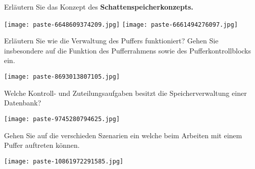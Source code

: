 \documentclass{article}
\begin{document}
\begin{tcolorbox}[colback=white!10!white,colframe=lightgray!75!black,
  savelowerto=\jobname_ex.tex,breakable,enhanced,lines before break=40]

\begin{center}
 Erläutern Sie das Konzept des 
\textbf{Schattenspeicherkonzepts.
} 

\end{center}

\tcblower

\justifying
\texttt{[image: paste-6648609374209.jpg]}
\texttt{[image: paste-6661494276097.jpg]}

\end{tcolorbox}
\begin{tcolorbox}[colback=white!10!white,colframe=lightgray!75!black,
  savelowerto=\jobname_ex.tex,breakable,enhanced,lines before break=40]

\begin{center}
 Erläutern Sie wie die Verwaltung des Puffers funktioniert? Gehen Sie insbesondere auf die Funktion des Pufferrahmens sowie des Pufferkontrollblocks ein. 

\end{center}

\tcblower

\justifying
\texttt{[image: paste-8693013807105.jpg]}

\end{tcolorbox}
\begin{tcolorbox}[colback=white!10!white,colframe=lightgray!75!black,
  savelowerto=\jobname_ex.tex,breakable,enhanced,lines before break=40]

\begin{center}
 Welche Kontroll- und Zuteilungsaufgaben besitzt die Speicherverwaltung einer Datenbank? 

\end{center}

\tcblower

\justifying
\texttt{[image: paste-9745280794625.jpg]}

\end{tcolorbox}
\begin{tcolorbox}[colback=white!10!white,colframe=lightgray!75!black,
  savelowerto=\jobname_ex.tex,breakable,enhanced,lines before break=40]

\begin{center}
 Gehen Sie auf die verschieden Szenarien ein welche beim Arbeiten mit einem Puffer auftreten können. 

\end{center}

\tcblower

\justifying
\texttt{[image: paste-10861972291585.jpg]}

\end{tcolorbox}
\end{document}
